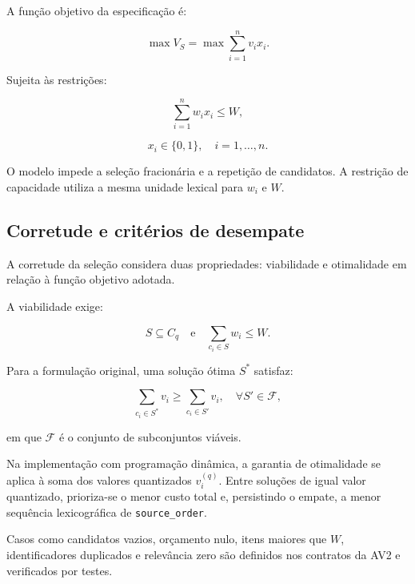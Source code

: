 \documentclass[11pt,a4paper]{article}
\theoremstyle{plain}
\theoremstyle{definition}
\theoremstyle{plain}
\begin{document}
A função objetivo da especificação é:

\begin{equation}
\max V_S=\max\sum_{i=1}^{n}v_i x_i.
\label{eq:funcao_objetivo}
\end{equation}

Sujeita às restrições:

\begin{equation}
\sum_{i=1}^{n}w_i x_i\leq W,
\label{eq:restricao_orcamento}
\end{equation}

\begin{equation}
x_i\in\{0,1\},
\quad i=1,\ldots,n.
\label{eq:restricao_binaria}
\end{equation}

O modelo impede a seleção fracionária e
a repetição de candidatos. A restrição de
capacidade utiliza a mesma unidade lexical
para $w_i$ e $W$.

\subsection{Corretude e critérios de desempate}

A corretude da seleção considera duas
propriedades: viabilidade e otimalidade
em relação à função objetivo adotada.

A viabilidade exige:

\begin{equation}
S\subseteq C_q
\quad\text{e}\quad
\sum_{c_i\in S}w_i\leq W.
\label{eq:corretude_viabilidade}
\end{equation}

Para a formulação original, uma solução
ótima $S^*$ satisfaz:

\begin{equation}
\sum_{c_i\in S^*}v_i
\geq
\sum_{c_i\in S'}v_i,
\quad \forall S'\in\mathcal{F},
\label{eq:corretude_otimalidade}
\end{equation}

em que $\mathcal{F}$ é o conjunto de
subconjuntos viáveis.

Na implementação com programação dinâmica,
a garantia de otimalidade se aplica à soma
dos valores quantizados $v_i^{(q)}$.
Entre soluções de igual valor quantizado,
prioriza-se o menor custo total e,
persistindo o empate, a menor sequência
lexicográfica de \texttt{source\_order}.

Casos como candidatos vazios, orçamento
nulo, itens maiores que $W$, identificadores
duplicados e relevância zero são definidos
nos contratos da AV2 e verificados por testes.
\end{document}
